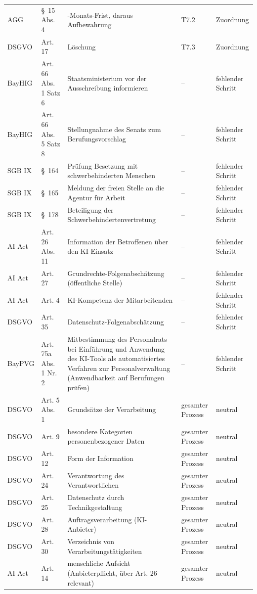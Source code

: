 \begin{small}
\begin{longtable}{@{}>{\raggedright\arraybackslash}p{1.6cm}>{\raggedright\arraybackslash}p{2.6cm}>{\raggedright\arraybackslash}p{5.6cm}>{\raggedright\arraybackslash}p{2.4cm}>{\raggedright\arraybackslash}p{2.0cm}@{}}
AGG & §~15 Abs. 4 & 2-Monats-Frist, daraus Aufbewahrung & T7.2 & Zuordnung \\
DSGVO & Art. 17 & Löschung & T7.3 & Zuordnung \\
BayHIG & Art. 66 Abs. 1 Satz 6 & Staatsministerium vor der Ausschreibung informieren & -- & fehlender Schritt \\
BayHIG & Art. 66 Abs. 5 Satz 8 & Stellungnahme des Senats zum Berufungsvorschlag & -- & fehlender Schritt \\
SGB IX & §~164 & Prüfung Besetzung mit schwerbehinderten Menschen & -- & fehlender Schritt \\
SGB IX & §~165 & Meldung der freien Stelle an die Agentur für Arbeit & -- & fehlender Schritt \\
SGB IX & §~178 & Beteiligung der Schwerbehindertenvertretung & -- & fehlender Schritt \\
AI Act & Art. 26 Abs. 11 & Information der Betroffenen über den KI-Einsatz & -- & fehlender Schritt \\
AI Act & Art. 27 & Grundrechte-Folgenabschätzung (öffentliche Stelle) & -- & fehlender Schritt \\
AI Act & Art. 4 & KI-Kompetenz der Mitarbeitenden & -- & fehlender Schritt \\
DSGVO & Art. 35 & Datenschutz-Folgenabschätzung & -- & fehlender Schritt \\
BayPVG & Art. 75a Abs. 1 Nr. 2 & Mitbestimmung des Personalrats bei Einführung und Anwendung des KI-Tools als automatisiertes Verfahren zur Personalverwaltung (Anwendbarkeit auf Berufungen prüfen) & -- & fehlender Schritt \\
DSGVO & Art. 5 Abs. 1 & Grundsätze der Verarbeitung & gesamter Prozess & neutral \\
DSGVO & Art. 9 & besondere Kategorien personenbezogener Daten & gesamter Prozess & neutral \\
DSGVO & Art. 12 & Form der Information & gesamter Prozess & neutral \\
DSGVO & Art. 24 & Verantwortung des Verantwortlichen & gesamter Prozess & neutral \\
DSGVO & Art. 25 & Datenschutz durch Technikgestaltung & gesamter Prozess & neutral \\
DSGVO & Art. 28 & Auftragsverarbeitung (KI-Anbieter) & gesamter Prozess & neutral \\
DSGVO & Art. 30 & Verzeichnis von Verarbeitungstätigkeiten & gesamter Prozess & neutral \\
AI Act & Art. 14 & menschliche Aufsicht (Anbieterpflicht, über Art. 26 relevant) & gesamter Prozess & neutral \\

\end{longtable}
\end{small}
